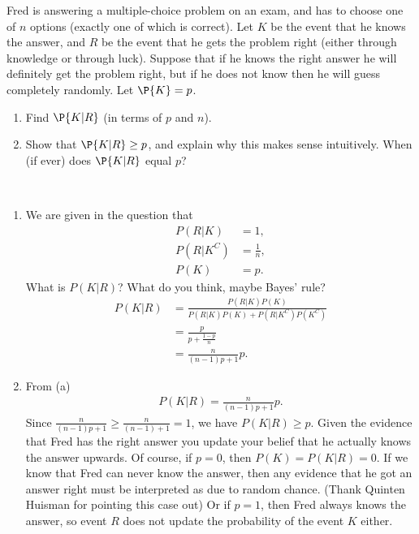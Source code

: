 
\begin{exercise}[BH.2.3]
\setcounter{theorem}{2}
Fred is answering a multiple-choice problem on an exam, and has to choose one of $n$ options (exactly one of which is correct). Let $K$ be the event that he knows the answer, and $R$ be the event that he gets the problem right (either through knowledge or through luck). Suppose that if he knows the right answer he will definitely get the problem right, but if he does not know then he will guess completely randomly. Let $\P{K} = p$.
	\begin{enumerate}
		\item Find $\P{K|R}$ (in terms of $p$ and $n$).
		\item Show that $\P{K|R} \geq p$, and explain why this makes sense intuitively. When (if ever) does $\P{K|R}$ equal $p$?
	\end{enumerate}
\begin{solution}~
	\begin{enumerate}
		\item We are given in the question that
		\begin{align*}
			P(R|K) &= 1,\\
			P(R|K^{C})&=\frac{1}{n},\\
			P(K) &= p.
		\end{align*}
		What is $P(K|R)$? What do you think, maybe Bayes' rule?
		\begin{align*}
			P(K|R)& = \frac{P(R|K)P(K)}{P(R|K)P(K)+P(R|K^{C})P(K^{C})}\\
			&=\frac{p}{p + \frac{1-p}{n}}\\
			& = \frac{n}{(n-1)p+1}p.
		\end{align*}
		\item  From (a)
		\begin{align*}
			P(K|R) = \frac{n}{(n-1)p+1}p.
		\end{align*}
		Since $\frac{n}{(n-1)p+1}\geq \frac{n}{(n-1)+1} = 1$, we have $P(K|R)\geq p$. Given the evidence that Fred has the right answer you update your belief that he actually knows the answer upwards. Of course, if $p=0$, then $P(K)=P(K|R)=0$. If we know that Fred can never know the answer, then any evidence that he got an answer right must be interpreted as due to random chance. (Thank Quinten Huisman for pointing this case out) Or if $p=1$, then Fred always knows the answer, so event $R$ does not update the probability of the event $K$ either. 
	\end{enumerate}
\end{solution}
\end{exercise}

